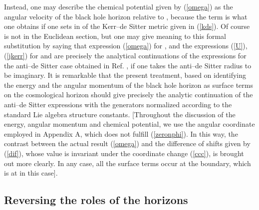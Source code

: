 \documentclass[a4paper,preprintnumbers,amsmath,amssymb]{revtex4}
\begin{document}
Instead, one may describe the chemical potential \myHighlight{$\Omega$}\coordHE{} given by (\ref{omega}) as the angular velocity of the black hole horizon relative to
\coordHE{}, because the term \coordHE{} is what one obtains if one sets \coordHE{} in \coordHE{} of the Kerr--de Sitter metric given in (\ref{kds}). Of course
\coordHE{} is not in the Euclidean section, but one may give meaning to this formal substitution by saying that expression (\ref{omega}) for \myHighlight{$\Omega$}\coordHE{}, and the expressions (\ref{U}), (\ref{jkerr}) for \coordHE{} and \coordHE{} are precisely the analytical continuations of the expressions for the anti--de Sitter case obtained in Ref. \cite{HT}, if one takes the anti--de Sitter radius to be imaginary.
It is remarkable that the present treatment, based on identifying the energy and the angular momentum of the black hole horizon as surface terms on the cosmological
horizon should give precisely
the analytic continuation of the anti--de Sitter expressions with the generators normalized
according to the standard \coordHE{} Lie algebra structure constants.
[Throughout the discussion of the energy, angular momentum and chemical potential, we  use the angular coordinate employed in Appendix A, which does not fulfill (\ref{zeronphi}). In this way, the contrast between the actual result (\ref{omega}) and the difference of shifts given by (\ref{dif}), whose value
is invariant under the coordinate change (\ref{ccc}), is brought out more clearly. In any case, all the surface terms occur at the boundary, which is at \coordHE{}
in this case].

\subsection*{Reversing the roles of the horizons}
\end{document}
